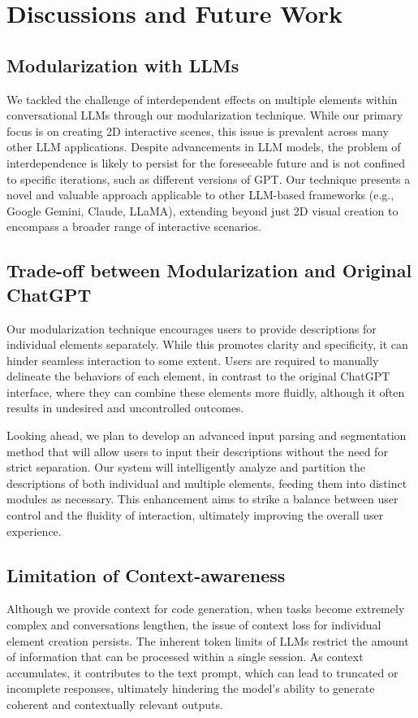 \section{Discussions and Future Work}

\subsection{Modularization with LLMs}
We tackled the challenge of interdependent effects on multiple elements within conversational LLMs through our  modularization technique. While our primary focus is on creating 2D interactive scenes, this issue is prevalent across {many other} %
LLM applications. Despite advancements in LLM models, the problem of interdependence is likely to persist for the foreseeable future and is not confined to specific iterations, such as different versions of GPT. Our %
technique presents a novel and valuable approach applicable to {other} %
LLM-based frameworks {(e.g., Google Gemini, Claude, LLaMA)}, extending beyond just 2D visual creation to encompass a broader range of interactive scenarios.

\subsection{Trade-off between Modularization and Original ChatGPT}
Our modularization technique encourages users to provide descriptions for individual elements separately. While this promotes clarity and specificity, it can hinder seamless interaction to some extent. Users are required to manually delineate the behaviors of each element, in contrast to the original ChatGPT interface, where they can combine these elements more fluidly, although it often results in undesired and uncontrolled outcomes.

Looking ahead, we plan to develop an advanced input parsing and segmentation method that will allow users to input their descriptions without the need for strict separation. Our system will intelligently analyze and partition the descriptions of both individual and multiple elements, feeding them into distinct modules as necessary. This enhancement aims to strike a balance between user control and the fluidity of interaction, ultimately improving the overall user experience.

\subsection{Limitation of Context-awareness}
Although we provide context for code generation, when tasks become extremely complex and conversations lengthen, the issue of context loss for individual element creation persists. The inherent token limits of LLMs restrict the amount of information that can be processed within a single session. As context accumulates, it contributes to the text prompt, which can lead to truncated or incomplete responses, ultimately hindering the model's ability to generate coherent and contextually relevant outputs.

